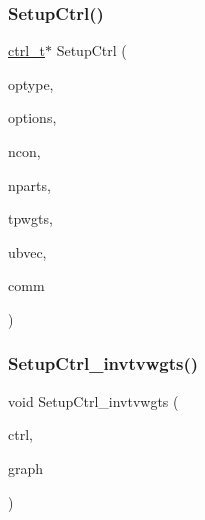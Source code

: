 \mbox{\label{a00951_a0825cb8d3761f52e758d1f8d0ade36f5}} 
\subsubsection{\texorpdfstring{Setup\+Ctrl()}{SetupCtrl()}}
{\footnotesize\ttfamily \hyperlink{a00742}{ctrl\+\_\+t}$\ast$ Setup\+Ctrl (\begin{DoxyParamCaption}\item[{\hyperlink{a00840_a8f61c0f0e4ba81b0e3b6901026acb936}{pmoptype\+\_\+et}}]{optype,  }\item[{\hyperlink{a00876_aaa5262be3e700770163401acb0150f52}{idx\+\_\+t} $\ast$}]{options,  }\item[{\hyperlink{a00876_aaa5262be3e700770163401acb0150f52}{idx\+\_\+t}}]{ncon,  }\item[{\hyperlink{a00876_aaa5262be3e700770163401acb0150f52}{idx\+\_\+t}}]{nparts,  }\item[{\hyperlink{a00876_a1924a4f6907cc3833213aba1f07fcbe9}{real\+\_\+t} $\ast$}]{tpwgts,  }\item[{\hyperlink{a00876_a1924a4f6907cc3833213aba1f07fcbe9}{real\+\_\+t} $\ast$}]{ubvec,  }\item[{M\+P\+I\+\_\+\+Comm}]{comm }\end{DoxyParamCaption})}

\mbox{\label{a00951_addb1218f833155110864d49f0d1879ab}} 
\subsubsection{\texorpdfstring{Setup\+Ctrl\+\_\+invtvwgts()}{SetupCtrl\_invtvwgts()}}
{\footnotesize\ttfamily void Setup\+Ctrl\+\_\+invtvwgts (\begin{DoxyParamCaption}\item[{\hyperlink{a00742}{ctrl\+\_\+t} $\ast$}]{ctrl,  }\item[{\hyperlink{a00734}{graph\+\_\+t} $\ast$}]{graph }\end{DoxyParamCaption})}

